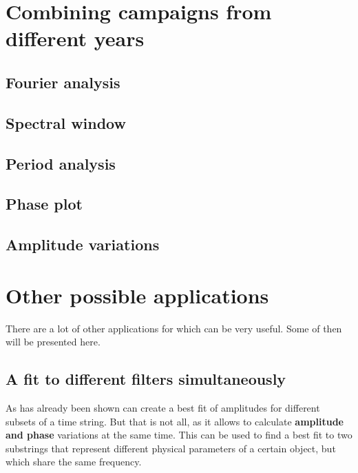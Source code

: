 \section{Combining campaigns from different years}

\subsection{Fourier analysis}

\subsection{Spectral window}

\subsection{Period analysis}

\subsection{Phase plot}

\subsection{Amplitude variations}


\section{Other possible applications}
There are a lot of other applications for which \period can be very useful.
Some of then will be presented here.

\subsection{A fit to different filters simultaneously}
As has already been shown \period can create a best fit of amplitudes
for different subsets of a time string. But that is not all, as it allows 
to calculate {\bf amplitude and phase} variations at the same time.
This can be used to find a best fit to two substrings that 
represent different physical parameters of a certain object, 
but which share the same frequency.

